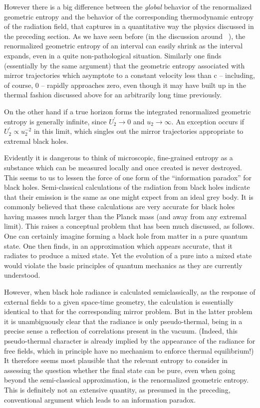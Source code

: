 However there is a big difference between
the {\it global\/} behavior of the renormalized geometric entropy
and the behavior of the corresponding thermodynamic
entropy of the radiation field, that captures in a quantitative way
the physics discussed in the preceding section.  As we have seen
before (in the discussion around \intent\ ), the
renormalized geometric entropy of an interval
can easily shrink as the interval expands, even
in a quite non-pathological
situation.   Similarly one finds (essentially by the same argument)
that the geometric entropy associated with mirror trajectories which
asymptote to a constant velocity less than c -- including, of course,
0 -- rapidly approaches zero, even though it may have built up in the
thermal fashion discussed above for an arbitrarily long time previously.

On the other hand if a true horizon forms the integrated
renormalized geometric
entropy is generally infinite, since $U_2^\prime \rightarrow 0$ and
 $u_2 \rightarrow \infty$.
An exception occurs if $U_2^\prime \propto u_2^{-2}$ in this limit, which
singles out the mirror trajectories appropriate to extremal black holes.


Evidently it is dangerous to think of microscopic, fine-grained
entropy as a substance which can be measured locally
and once created is never destroyed.  This seems to us to
lessen the force of
one form of the ``information paradox'' for black holes.
Semi-classical calculations of the radiation from black holes
indicate that
their emission is the same as one might expect from an ideal grey body.
It is commonly believed that these calculations are very accurate for
black holes having masses much larger than the Planck mass (and away
from any extremal limit).   This raises a conceptual problem that has
been much discussed, as follows.
One can certainly imagine forming a black hole from
matter in a pure quantum state.  One then finds, in an
approximation which appears accurate,
that it radiates to produce a mixed
state.  Yet the evolution of a pure into a mixed state
would violate the basic
principles of quantum mechanics as they are currently understood.


However,
when
black hole radiance is calculated semiclassically, as the response
of external fields to a given space-time geometry, the calculation is
essentially identical to that for the corresponding mirror problem.
But in the latter problem it is unambiguously clear that the radiance
is only pseudo-thermal, being in a precise sense a
reflection of correlations
present in the vacuum.  (Indeed, this pseudo-thermal character
is already implied by the appearance of the radiance for
free fields, which in principle have no mechanism to enforce
thermal equilibrium!)  It therefore seems most
plausible that the relevant entropy to
consider in assessing the question whether the final
state can be pure, even when going beyond the
semi-classical approximation, is the renormalized geometric entropy.
This is definitely
not an extensive quantity, as presumed in the
preceding, conventional argument which leads to an information paradox.



